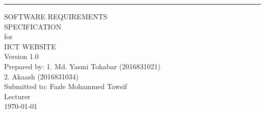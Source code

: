 \documentclass{scrreprt}
\date{}
\def\myversion{1.0 }
\begin{document}
\begin{flushright}
    \rule{\linewidth}{5pt}\vskip1cm
    \begin{bfseries}
        \Huge{SOFTWARE REQUIREMENTS\\ SPECIFICATION}\\
        \vspace{1.5cm}
        for\\
        \vspace{1.5cm}
        IICT WEBSITE\\
        \vspace{1.5cm}
        \LARGE{Version \myversion}\\
        \vspace{1.5cm}
        Prepared by: 1. Md. Yasmi Tohabar (2016831021)\\
        2. Akaash (2016831034)\\
        \vspace{1.5cm}
        Submitted to: Fazle Mohammed Tawsif \\Lecturer\\
        \vspace{1.5cm}
        \today\\
    \end{bfseries}
\end{flushright}

\tableofcontents










\end{document}
